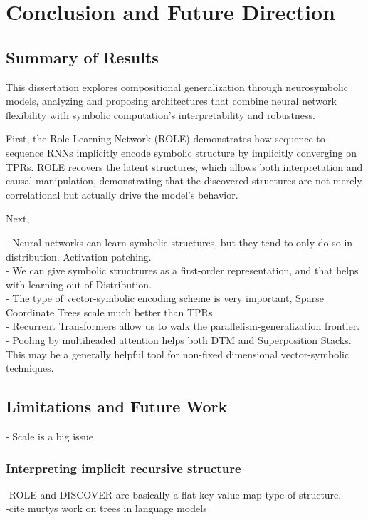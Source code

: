 \chapter{Conclusion and Future Direction} \label{chap:chap-6}
\section{Summary of Results}

This dissertation explores compositional generalization through neurosymbolic models, analyzing and proposing architectures that combine neural network flexibility with symbolic computation's interpretability and robustness.

First, the Role Learning Network (ROLE) demonstrates how sequence-to-sequence RNNs implicitly encode symbolic structure by implicitly converging on TPRs. ROLE recovers the latent structures, which allows both interpretation and causal manipulation, demonstrating that the discovered structures are not merely correlational but actually drive the model's behavior.

Next, 

- Neural networks can learn symbolic structures, but they tend to only do so in-distribution. Activation patching.\\
- We can give symbolic structrures as a first-order representation, and that helps with learning out-of-Distribution.\\
- The type of vector-symbolic encoding scheme is very important, Sparse Coordinate Trees scale much better than TPRs\\
- Recurrent Transformers allow us to walk the parallelism-generalization frontier.\\
- Pooling by multiheaded attention helps both DTM and Superposition Stacks. This may be a generally helpful tool for non-fixed dimensional vector-symbolic techniques.\\

\section{Limitations and Future Work}
- Scale is a big issue

\subsection{Interpreting implicit recursive structure}
-ROLE and DISCOVER are basically a flat key-value map type of structure.\\
-cite murtys work on trees in language models


